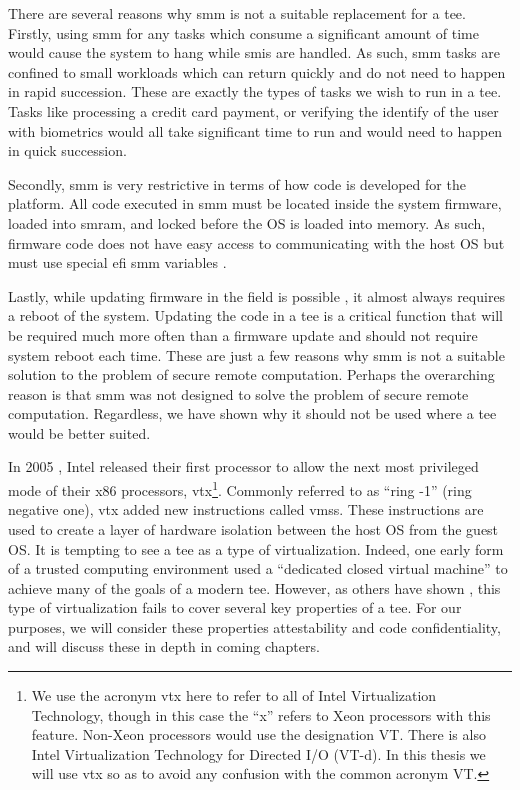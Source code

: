 There are several reasons why \gls{smm} is not a suitable replacement for a \gls{tee}. Firstly, using \gls{smm} for any tasks which consume a significant amount of time would cause the system to hang while \glspl{smi} are handled. As such, \gls{smm} tasks are confined to small workloads which can return quickly and do not need to happen in rapid succession. These are exactly the types of tasks we wish to run in a \gls{tee}. Tasks like processing a credit card payment, or verifying the identify of the user with biometrics would all take significant time to run and would need to happen in quick succession.

Secondly, \gls{smm} is very restrictive in terms of how code is developed for the platform. All code executed in \gls{smm} must be located inside the system firmware, loaded into \gls{smram}, and locked before the OS is loaded into memory. As such, firmware code does not have easy access to communicating with the host OS but must use special \gls{efi} \gls{smm} variables \cite{uefi2020}.

Lastly, while updating firmware in the field is possible \cite{zimmer2011apparatus}, it almost always requires a reboot of the system. Updating the code in a \gls{tee} is a critical function that will be required much more often than a firmware update and should not require system reboot each time. These are just a few reasons why \gls{smm} is not a suitable solution to the problem of secure remote computation. Perhaps the overarching reason is that \gls{smm} was not designed to solve the problem of secure remote computation. Regardless, we have shown why it should not be used where a \gls{tee} would be better suited.

In 2005 \cite{uhlig2005intel}, Intel released their first processor to allow the next most privileged mode of their x86 processors, \gls{vtx}\footnote{We use the acronym \gls{vtx} here to refer to all of Intel Virtualization Technology, though in this case the ``x'' refers to Xeon processors with this feature. Non-Xeon processors would use the designation VT. There is also Intel Virtualization Technology for Directed I/O (VT-d). In this thesis we will use \gls{vtx} so as to avoid any confusion with the common acronym VT.}. Commonly referred to as ``ring -1'' (ring negative one), \gls{vtx} added new instructions called \glspl{vms}. These instructions are used to create a layer of hardware isolation between the host OS from the guest OS. It is tempting to see a \gls{tee} as a type of virtualization. Indeed, one early form of a trusted computing environment used a ``dedicated closed virtual machine'' \cite{garfinkel2003terra} to achieve many of the goals of a modern \gls{tee}. However, as others have shown \cite{teeWhatIsIt}, this type of virtualization fails to cover several key properties of a \gls{tee}. For our purposes, we will consider these properties attestability and code confidentiality, and will discuss these in depth in coming chapters.

